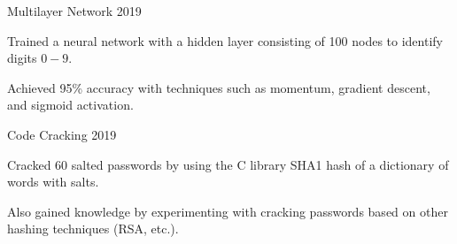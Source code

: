 
\begin{cventries}
  \cvproject
    {Multilayer Network} %
    {\normalsize 2019} %
    {
      \large
      \begin{cvitems} %
        \item {Trained a neural network with a hidden layer consisting of 100 nodes to identify digits  $0-9$.}
        \item {Achieved 95\% accuracy with techniques such as momentum, gradient descent, and sigmoid activation.}
      \end{cvitems}
    }

  \cvproject
    {Code Cracking} %
    {\normalsize 2019} %
    {
    \large
      \begin{cvitems} %
      	\item {Cracked 60 salted passwords by using the C library SHA1 hash of a dictionary of words with salts.}
      	\item {Also gained knowledge by experimenting with cracking passwords based on other hashing techniques (RSA, etc.).}
      \end{cvitems}
    }
\end{cventries}
